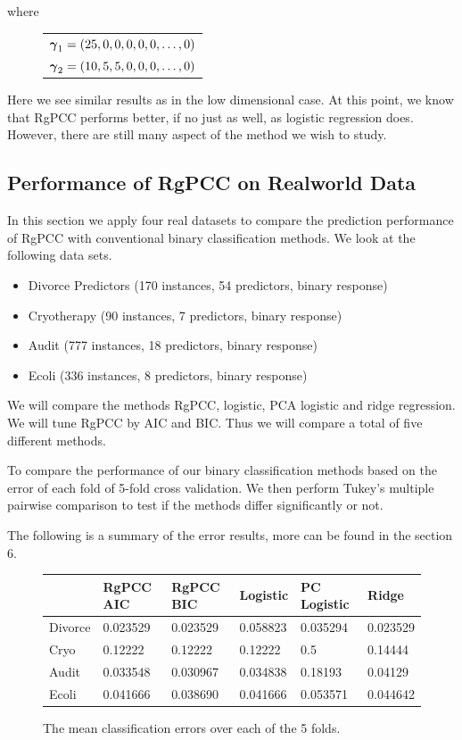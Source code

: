 \documentclass[main.tex]{subfiles}
\begin{document}
where

\begin{figure}[H]
	\begin{tabular}{l}
		$\boldsymbol \gamma_1 = (25, 0, 0, 0, 0, 0, \ldots , 0)$ \\
		$\boldsymbol \gamma_2 = (10, 5, 5, 0, 0, 0, \ldots , 0)$
	\end{tabular}
\end{figure}

Here we see similar results as in the low dimensional case. At this point, we know that RgPCC performs better, if no just as well, as logistic regression does. However, there are still many aspect of the method we wish to study.

\subsection{Performance of RgPCC on Realworld Data}

In this section we apply four real datasets to compare the prediction performance of RgPCC with conventional binary classification methods. We look at the following data sets.
\begin{itemize}
    \item Divorce Predictors (170 instances, 54 predictors, binary response)
    \item Cryotherapy (90 instances, 7 predictors, binary response)
    \item Audit (777 instances, 18 predictors, binary response)
    \item Ecoli (336 instances, 8 predictors, binary response)
\end{itemize}

We will compare the methods RgPCC, logistic, PCA logistic and ridge regression. We will tune RgPCC by AIC and BIC. Thus we will compare a total of five different methods. 

To compare the performance of our binary classification methods based on the error of each fold of 5-fold cross validation. We then perform Tukey's multiple pairwise comparison to test if the methods differ significantly or not.

The following is a summary of the error results, more can be found in the section 6.

\begin{figure}[H]
	\begin{tabular}{l | l l l l l} \hline
    & RgPCC AIC & RgPCC BIC & Logistic & PC Logistic & Ridge \\ \hline
    \rowcolor{LightCyan}
    Divorce & 0.023529 & 0.023529 & 0.058823 & 0.035294 & 0.023529\\
    Cryo & 0.12222 & 0.12222 & 0.12222         &  0.5 & 0.14444 \\
    \rowcolor{LightCyan}
    Audit & 0.033548 & 0.030967 & 0.034838    & 0.18193 & 0.04129\\
    Ecoli & 0.041666 & 0.038690 & 0.041666  & 0.053571 & 0.044642\\ \hline
	\end{tabular}
	\caption{The mean classification errors over each of the 5 folds.}
\end{figure}
\end{document}
